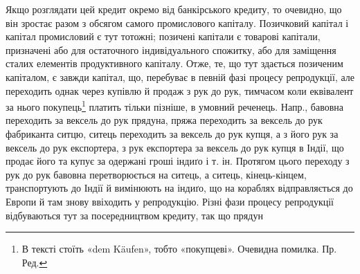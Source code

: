 Якщо розглядати цей кредит окремо від банкірського кредиту, то очевидно,
що він зростає разом з обсягом самого промислового капіталу. Позичковий капітал
і капітал промисловий є тут тотожні; позичені капітали є товарові капітали,
призначені або для остаточного індивідуального спожитку, або для заміщення
сталих елементів продуктивного капіталу. Отже, те, що тут здається
позиченим капіталом, є завжди капітал, що, перебуває в певній фазі процесу репродукції,
але переходить однак через купівлю й продаж з рук до рук, тимчасом
коли еквівалент за нього покупець\footnote*{
В тексті стоїть «dem Käufen», тобто «покупцеві». Очевидна помилка. Пр. Ред.
} платить тільки пізніше, в умовний реченець.
Напр., бавовна переходить за вексель до рук прядуна, пряжа переходить за
вексель до рук фабриканта ситцю, ситець переходить за вексель до рук купця,
а з його рук за вексель до рук експортера, з рук експортера за вексель до рук
купця в Індії, що продає його та купує за одержані гроші індиґо і т. ін. Протягом
цього переходу з рук до рук бавовна перетворюється на ситець, а ситець,
кінець-кінцем, транспортують до Індії й вимінюють на індиґо, що на кораблях
відправляється до Европи й там знову ввіходить у репродукцію. Різні фази процесу
репродукції відбуваються тут за посередництвом кредиту, так що прядун
\parbreak{}  %

